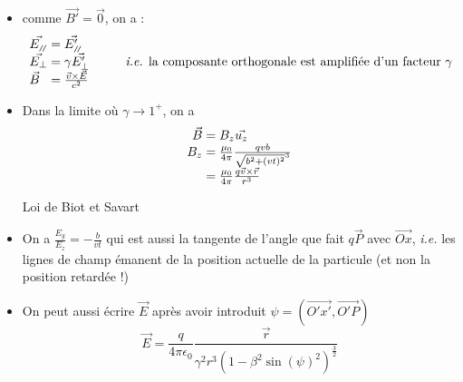 \begin{remarks}\hspace{1pt}
	\begin{itemize}
		\item comme $\vec{B'}=\vec{0}$, on a :
		$$
			\begin{array}{l@{\;}l}
				\vec{E_{\para}}&=\vec{E'_{\para}}\\
				\vec{E_{\perp}}&=\gamma\vec{E'_{\perp}} \kern 1cm \text{\emph{i.e.} la composante orthogonale est amplifiée d'un facteur }\gamma\\
				\vec{B}&=\frac{\vec{v}\times\vec{E}}{c^2}
			\end{array}
		$$
		\item Dans la limite où $\gamma \longrightarrow 1^+$, on a
		$$
			\begin{array}{r@{\;}l}
				\vec{B}&=B_z\vec{u_z}\\
				B_z&=\frac{\mu_0}{4\pi}\frac{qvb}{\sqrt{b^2+(vt)^2}^3}\\
					&=\frac{\mu_0}{4\pi}\frac{q\vec{v}\times\vec{r}}{r^3}
			\end{array}\\
		$$\begin{flushright}
			\small Loi de Biot et Savart
		\end{flushright}
		\item {\txt On a $\frac{E_y}{E_z}=-\frac{b}{vt}$ qui est aussi la tangente de l'angle que fait $q\vec{P}$ avec $\vec{Ox}$, \emph{i.e.} les lignes de champ émanent de la position actuelle de la particule (et non la position retardée !)}
		\item On peut aussi écrire $\vec{E}$ après avoir introduit $\psi=(\vec{O'x'},\vec{O'P})$
		$$
			\vec{E}=\frac{q}{4\pi\epsilon_0}\frac{\vec{r}}{\gamma^2r^3(1-\beta^2\sin(\psi)^2)^{\frac{3}{2}}}
		$$
	\end{itemize}
\end{remarks}